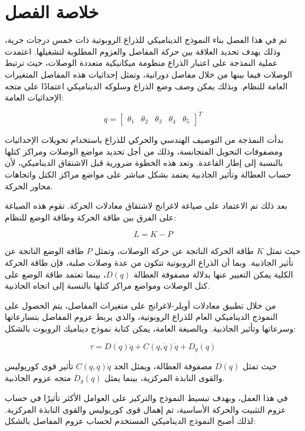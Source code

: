 \section{خلاصة الفصل}


تم في هذا الفصل بناء النموذج الديناميكي للذراع الروبوتية ذات خمس درجات حرية، وذلك بهدف تحديد العلاقة بين حركة المفاصل والعزوم المطلوبة لتشغيلها. اعتمدت عملية النمذجة على اعتبار الذراع منظومة ميكانيكية متعددة الوصلات، حيث ترتبط الوصلات فيما بينها من خلال مفاصل دورانية، وتمثل إحداثيات هذه المفاصل المتغيرات العامة للنظام. وبذلك يمكن وصف وضع الذراع وسلوكه الديناميكي اعتمادًا على متجه الإحداثيات العامة:

\[
q =
\begin{bmatrix}
\theta_1 &
\theta_2 &
\theta_3 &
\theta_4 &
\theta_5
\end{bmatrix}^{T}
\]

بدأت النمذجة من التوصيف الهندسي والحركي للذراع باستخدام تحويلات الإحداثيات ومصفوفات التحويل المتجانسة، وذلك من أجل تحديد مواضع الوصلات ومراكز كتلها بالنسبة إلى إطار القاعدة. وتعد هذه الخطوة ضرورية قبل الاشتقاق الديناميكي، لأن حساب العطالة وتأثير الجاذبية يعتمد بشكل مباشر على مواضع مراكز الكتل واتجاهات محاور الحركة.

بعد ذلك تم الاعتماد على صياغة لاغرانج لاشتقاق معادلات الحركة. تقوم هذه الصياغة على الفرق بين طاقة الحركة وطاقة الوضع للنظام:

\[
L = K - P
\]

حيث تمثل \(K\) طاقة الحركة الناتجة عن حركة الوصلات، وتمثل \(P\) طاقة الوضع الناتجة عن تأثير الجاذبية. وبما أن الذراع الروبوتية تتكون من عدة وصلات صلبة، فإن طاقة الحركة الكلية يمكن التعبير عنها بدلالة مصفوفة العطالة \(D(q)\)، بينما تعتمد طاقة الوضع على كتل الوصلات ومواضع مراكز كتلها بالنسبة إلى اتجاه الجاذبية.

من خلال تطبيق معادلات أويلر-لاغرانج على متغيرات المفاصل، يتم الحصول على النموذج الديناميكي العام للذراع الروبوتية، والذي يربط عزوم المفاصل بتسارعاتها وسرعاتها وتأثير الجاذبية. وبالصيغة العامة، يمكن كتابة نموذج ديناميك الروبوت بالشكل:

\[
\tau =
D(q)\ddot{q}
+
C(q,\dot{q})\dot{q}
+
D_g(q)
\]

حيث تمثل \(D(q)\) مصفوفة العطالة، ويمثل الحد \(C(q,\dot{q})\dot{q}\) تأثير قوى كوريوليس والقوى النابذة المركزية، بينما يمثل \(D_g(q)\) متجه عزوم الجاذبية.

في هذا العمل، وبهدف تبسيط النموذج والتركيز على العوامل الأكثر تأثيرًا في حساب عزوم التثبيت والحركة الأساسية، تم إهمال قوى كوريوليس والقوى النابذة المركزية. لذلك أصبح النموذج الديناميكي المستخدم لحساب عزوم المفاصل بالشكل:


